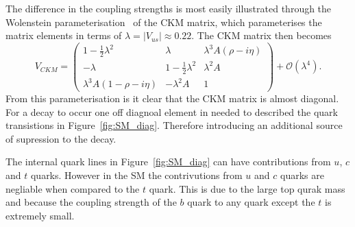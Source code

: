 The difference in the coupling strengths is most easily illustrated through the Wolenstein parameterisation~\cite{} of the CKM matrix, which parameterises the matrix elements in terms of $\lambda = |V_{us}| \approx 0.22$. The CKM matrix then becomes
\begin{equation}
V_{CKM} =
 \begin{pmatrix}
 1 - \frac{1}{2}\lambda^2 & \lambda & \lambda^3 A (\rho - i \eta) \\
 - \lambda                & 1 - \frac{1}{2}\lambda^2 & \lambda^2 A \\
 \lambda^3 A (1 - \rho- i \eta) & -\lambda^2 A & 1
 \end{pmatrix} + \mathcal{O}(\lambda^4).
\label{eq:CKMB}
\end{equation}
From this parameterisation is it clear that the CKM matrix is almost diagonal. For a \bmumu decay to occur one off diagnoal element in needed to described the quark transistions in Figure~\ref{fig:SM_diag}. Therefore introducing an additional source of supression to the decay. 

The internal quark lines in Figure~\ref{fig:SM_diag} can have contributions from $u$, $c$ and $t$ quarks. However in the SM the contrivutions from $u$ and $c$ quarks are negliable when compared to the $t$ quark. This is due to the large top qurak mass and because the coupling strength of the $b$ quark to any quark except the $t$ is extremely small.


